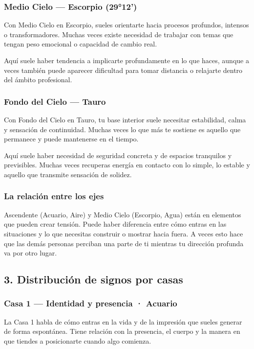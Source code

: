 \documentclass[11pt,a4paper]{article}
\begin{document}
\subsubsection*{Medio Cielo — Escorpio (29°12')}
Con Medio Cielo en Escorpio, sueles orientarte hacia procesos profundos, intensos o transformadores. Muchas veces existe necesidad de trabajar con temas que tengan peso emocional o capacidad de cambio real.

Aquí suele haber tendencia a implicarte profundamente en lo que haces, aunque a veces también puede aparecer dificultad para tomar distancia o relajarte dentro del ámbito profesional.

\subsubsection*{Fondo del Cielo — Tauro}
Con Fondo del Cielo en Tauro, tu base interior suele necesitar estabilidad, calma y sensación de continuidad. Muchas veces lo que más te sostiene es aquello que permanece y puede mantenerse en el tiempo.

Aquí suele haber necesidad de seguridad concreta y de espacios tranquilos y previsibles. Muchas veces recuperas energía en contacto con lo simple, lo estable y aquello que transmite sensación de solidez.

\subsubsection*{La relación entre los ejes}
Ascendente (Acuario, Aire) y Medio Cielo (Escorpio, Agua) están en elementos que pueden crear tensión. Puede haber diferencia entre cómo entras en las situaciones y lo que necesitas construir o mostrar hacia fuera. A veces esto hace que las demás personas perciban una parte de ti mientras tu dirección profunda va por otro lugar.

\vspace{0.5cm}

\subsection{3. Distribución de signos por casas}

\subsubsection*{Casa 1 — Identidad y presencia · Acuario}
La Casa 1 habla de cómo entras en la vida y de la impresión que sueles generar de forma espontánea. Tiene relación con la presencia, el cuerpo y la manera en que tiendes a posicionarte cuando algo comienza.
\end{document}
